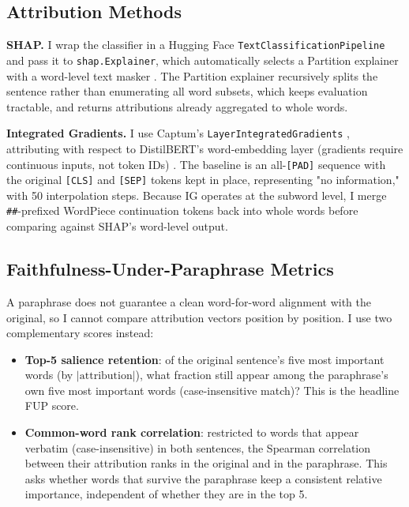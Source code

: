 \subsection{Attribution Methods}

\textbf{SHAP.} I wrap the classifier in a Hugging Face
\texttt{TextClassificationPipeline} and pass it to \texttt{shap.Explainer},
which automatically selects a Partition explainer with a word-level text
masker \citep{lundberg2017unified}. The Partition explainer recursively
splits the sentence rather than enumerating all word subsets, which
keeps evaluation tractable, and returns attributions already aggregated
to whole words.

\textbf{Integrated Gradients.} I use Captum's
\texttt{LayerIntegratedGradients} \citep{kokhlikyan2020captum},
attributing with respect to DistilBERT's word-embedding layer (gradients
require continuous inputs, not token IDs) \citep{sundararajan2017axiomatic}.
The baseline is an all-\texttt{[PAD]} sequence with the original
\texttt{[CLS]} and \texttt{[SEP]} tokens kept in place, representing "no
information," with 50 interpolation steps. Because IG operates at the
subword level, I merge \texttt{##}-prefixed WordPiece continuation tokens
back into whole words before comparing against SHAP's word-level output.

\subsection{Faithfulness-Under-Paraphrase Metrics}

A paraphrase does not guarantee a clean word-for-word alignment with the
original, so I cannot compare attribution vectors position by position.
I use two complementary scores instead:

\begin{itemize}
  \item \textbf{Top-5 salience retention}: of the original sentence's
  five most important words (by $|\text{attribution}|$), what fraction
  still appear among the paraphrase's own five most important words
  (case-insensitive match)? This is the headline FUP score.
  \item \textbf{Common-word rank correlation}: restricted to words that
  appear verbatim (case-insensitive) in both sentences, the Spearman
  correlation between their attribution ranks in the original and in the
  paraphrase. This asks whether words that survive the paraphrase keep a
  consistent relative importance, independent of whether they are in the
  top 5.
\end{itemize}

